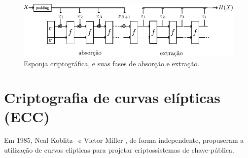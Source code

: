 \documentclass{SBCbookchapter}
\begin{document}
\begin{figure}[htbp]
\begin{center}
    \includegraphics{figures/sponge.pdf}
    \caption{Esponja criptográfica, e suas fases de absorção e extração.}
    \label{fig:sponge}
\end{center}
\end{figure}


\section{Criptografia de curvas elípticas (ECC)}


%
Em  1985,   Neal  Koblitz~\cite{Koblitz:1987:ECC}   e  Victor  Miller
\cite{Miller:1986:ECC}, de forma independente, propuseram a utilização
de curvas elípticas para  projetar criptossistemas de chave-pública. 
\end{document}
